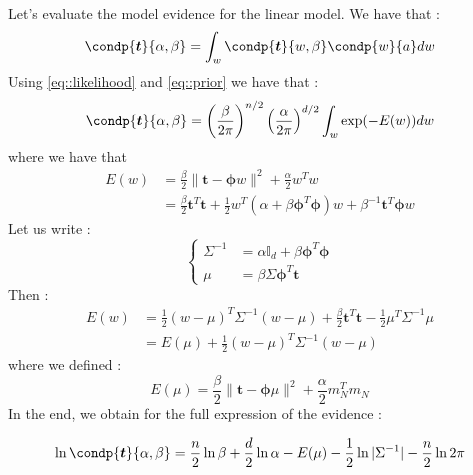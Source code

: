 \documentclass[a4paper]{article}
\newcommand\bt{\boldsymbol{t}}
\newcommand\bphi{\boldsymbol{\phi}}
\begin{document}
{{			\paragraph{} Let's evaluate the model evidence for the linear model. We have that : 
			\begin{equation}
				\condp{\boldsymbol{t}}{\alpha, \beta} = \int_w \condp{\boldsymbol{t}}{w,\beta}\condp{w}{a}dw
			\end{equation}
			Using \eqref{eq::likelihood} and \eqref{eq::prior} we have that : 
			\begin{equation}
				\condp{\boldsymbol{t}}{\alpha, \beta} = \left(\frac{\beta}{2\pi}\right)^{n/2} \left(\frac{\alpha}{2\pi}\right)^{d/2} \int_w \exp(-E(w))dw 
			\end{equation}
			where we have that 
			\begin{equation}
				\begin{aligned}
					E(w) &= \frac{\beta}{2}\lVert \bt - \bphi w\rVert^2 + \frac{\alpha}{2}w^Tw\\
						&=  \frac{\beta}{2} \bt^T\bt +\frac{1}{2}w^T\left(\alpha+\beta\bphi^T\bphi\right)w + \beta^{-1}\bt^T\bphi w
				\end{aligned}
			\end{equation}
			Let us write : 
			\begin{equation}
			\left\{
				\begin{aligned}
					\Sigma^{-1} &= \alpha\mathds{I}_d + \beta\bphi^T\bphi \\
					\mu &= \beta\Sigma\bphi^T\bt
				\end{aligned}\right.
			\end{equation}
			Then : 
			\begin{equation}
				\begin{aligned}
					E(w) &= \frac{1}{2}(w-\mu)^T\Sigma^{-1}(w-\mu)  +  \frac{\beta}{2} \bt^T\bt - \frac{1}{2}\mu^T\Sigma^{-1}\mu \\
						&= E(\mu) + \frac{1}{2}(w-\mu)^T\Sigma^{-1}(w-\mu) 
				\end{aligned}
			\end{equation}
			where we defined : 
			\begin{equation}
				E(\mu) =  \frac{\beta}{2} \lVert \bt - \bphi\mu\rVert ^2 + \frac{\alpha}{2}m_N^Tm_N
			\end{equation}
			In the end, we obtain for the full expression of the evidence : 
			\vspace{5pt}
			
			{
				\begin{equation}
					\ln{\condp{\bt}{\alpha,\beta}} = \frac{n}{2}\ln\beta + \frac{d}{2}\ln\alpha - E(\mu) - \frac{1}{2}\ln{\vert \Sigma^{-1}\vert} - \frac{n}{2}\ln2\pi
				\end{equation}
			}
}}
\end{document}
